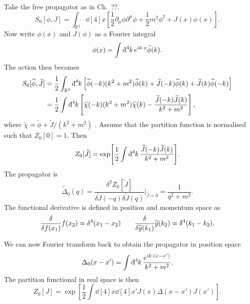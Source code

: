 Take the free propagator as in Ch.~??.
\begin{equation}
  S_0 [\phi, J] = \int_{\mathbb{R}^4} \dd[4]{x}  \left[ \frac{1}{2} \partial_{\mu} \phi \partial^{\mu} \phi + \frac{1}{2} m^2 \phi^2 + J(x) \phi(x) \right].
\end{equation}
Now write $\phi(x)$  and $J(\phi)$ as a Fourier integral
\begin{equation}
  \phi(x) = \int \bdd[4]{k} e^{i k \cdot x} \widetilde{\phi} (k).
\end{equation}
The action then becomes
\begin{align}
  S_0[\widetilde{\phi}, \widetilde{J}] &= \frac{1}{2} \int_{\mathbb{R}^4} \bdd[4]{k} \left[ \widetilde{\phi}(-k) (k^2 + m^2) \widetilde{\phi}(k) + \widetilde{J}(-k) \widetilde{\phi}(k) + \widetilde{J}(k) \widetilde{\phi}(-k) \right] \\
				       &= \frac{1}{2} \int \bdd[4]{k} \left[ \widetilde{\chi}(-k) (k^2 + m^2) \widetilde{\chi}(k) - \frac{\widetilde{J}(-k) \widetilde{J}(k)}{k^2 + m^2} \right],
\end{align}
where $\widetilde{\chi} = \widetilde{\phi} + \widetilde{J} / (k^2+ m^2)$ .
Assume that the partition function is normalised such that $Z_0[0] = 1$. Then
\begin{equation}
  Z_0[\widetilde{J}] = \exp[\frac{1}{2} \int \bdd[4]{k} \frac{\widetilde{J}(-k) \widetilde{J}(k)}{k^2 + m^2}].
\end{equation}
The propagator is
\begin{equation}
  \widetilde{\Delta}_0(q) = \frac{\delta^2 Z_0 [\widetilde{J}]}{\delta \widetilde{J}(-q) \delta \widetilde{J}(q)} \rvert_{\widetilde{J} = 0} = \frac{1}{q^2 +m^2}.
\end{equation}
The functional derivative is defined in position and momentum space as
\begin{equation}
  \frac{\delta }{\delta f(x_1)} f(x_2) = \delta^{4}(x_1 - x_2) \qquad \frac{\delta }{\delta \widetilde{g}(k_1)} \widetilde{g}(k_2) = \bdelta^{4}(k_1 - k_2).
\end{equation}

We can now Fourier transform back to obtain the propagator in position space
\begin{equation}
  \Delta_0(x - x') = \int \bdd[4]{k} \frac{e^{i k \cdot (x - x')}}{k^2 + m^2}.
\end{equation}
The partition functional in real space is then
\begin{equation}
  Z_0[J] = \exp[\frac{1}{2} \int \dd[4]{x} \dd[4]{x'} J(x) \Delta(x - x') J(x')].
\end{equation}

